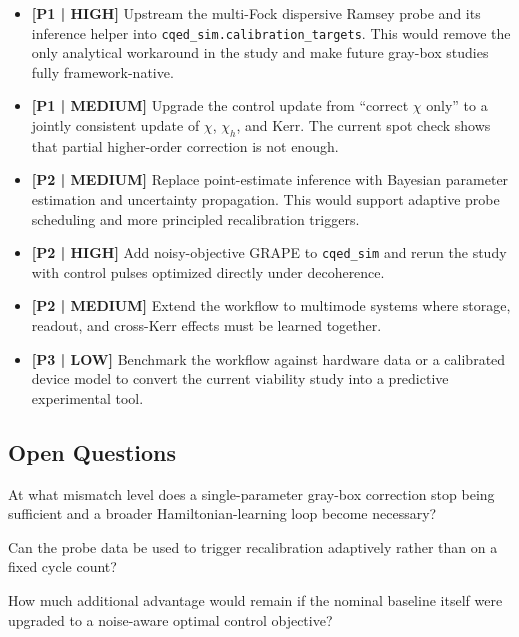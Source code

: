 \documentclass[aps,pra,twocolumn,reprint,amsmath,amssymb]{revtex4-2}
\begin{document}
\begin{itemize}
  \item \textbf{[P1 | HIGH]} Upstream the multi-Fock dispersive Ramsey probe and its inference
  helper into \texttt{cqed\_sim.calibration\_targets}. This would remove the only analytical workaround
  in the study and make future gray-box studies fully framework-native.
  \item \textbf{[P1 | MEDIUM]} Upgrade the control update from ``correct $\chi$ only'' to a
  jointly consistent update of $\chi$, $\chi_h$, and Kerr. The current spot check shows that
  partial higher-order correction is not enough.
  \item \textbf{[P2 | MEDIUM]} Replace point-estimate inference with Bayesian parameter
  estimation and uncertainty propagation. This would support adaptive probe scheduling and more
  principled recalibration triggers.
  \item \textbf{[P2 | HIGH]} Add noisy-objective GRAPE to \texttt{cqed\_sim} and rerun the study with
  control pulses optimized directly under decoherence.
  \item \textbf{[P2 | MEDIUM]} Extend the workflow to multimode systems where storage, readout,
  and cross-Kerr effects must be learned together.
  \item \textbf{[P3 | LOW]} Benchmark the workflow against hardware data or a calibrated device
  model to convert the current viability study into a predictive experimental tool.
\end{itemize}

\subsection{Open Questions}

At what mismatch level does a single-parameter gray-box correction stop being sufficient and a
broader Hamiltonian-learning loop become necessary?

Can the probe data be used to trigger recalibration adaptively rather than on a fixed cycle
count?

How much additional advantage would remain if the nominal baseline itself were upgraded to a
noise-aware optimal control objective?



\end{document}
